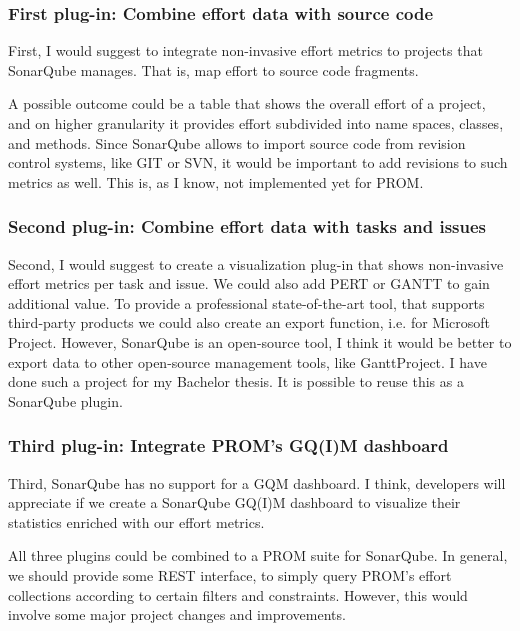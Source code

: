 \subsubsection{First plug-in: Combine effort data with source code}

First, I would suggest to integrate non-invasive effort metrics to projects that
SonarQube manages. That is, map effort to source code fragments. 

A possible outcome could be a table that shows the overall effort of a project,
and on higher granularity it provides effort subdivided into name spaces,
classes, and methods. Since SonarQube allows to import source code from revision
control systems, like GIT or SVN, it would be important to add revisions to such
metrics as well. This is, as I know, not implemented yet for PROM.

\subsubsection{Second plug-in: Combine effort data with tasks and issues}

Second, I would suggest to create a visualization plug-in that shows non-invasive
effort metrics per task and issue. We could also add PERT or GANTT to gain
additional value. To provide a professional state-of-the-art tool, that supports
third-party products we could also create an export function, i.e. for Microsoft
Project. However, SonarQube is an open-source tool, I think it would be better
to export data to other open-source management tools, like GanttProject. I have
done such a project for my Bachelor thesis. It is possible to reuse this as a
SonarQube plugin.

\subsubsection{Third plug-in: Integrate PROM's GQ(I)M dashboard}

Third, SonarQube has no support for a GQM dashboard. I think, developers will
appreciate if we create a SonarQube GQ(I)M dashboard to visualize their
statistics enriched with our effort metrics. 

All three plugins could be combined to a PROM suite for SonarQube. In general,
we should provide some REST interface, to simply query PROM's effort collections
according to certain filters and constraints. However, this would involve some
major project changes and improvements.
